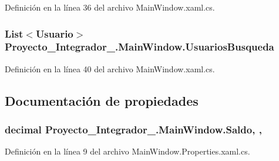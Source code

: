 Definición en la línea 36 del archivo Main\-Window.\-xaml.\-cs.

\hypertarget{class_proyecto___integrador__3_1_1_main_window_af1075eadedcbd62d11bd043542ea94de}{
\subsubsection[{Usuarios\-Busqueda}]{\setlength{\rightskip}{0pt plus 5cm}List$<${\bf Usuario}$>$ Proyecto\-\_\-\-Integrador\-\_.\-Main\-Window.\-Usuarios\-Busqueda\hspace{0.3cm}{\ttfamily [private]}}}\label{class_proyecto___integrador__3_1_1_main_window_af1075eadedcbd62d11bd043542ea94de}


Definición en la línea 40 del archivo Main\-Window.\-xaml.\-cs.



\subsection{Documentación de propiedades}
\hypertarget{class_proyecto___integrador__3_1_1_main_window_ad93b9e5447037b83ac9f811025390509}{
\subsubsection[{Saldo}]{\setlength{\rightskip}{0pt plus 5cm}decimal Proyecto\-\_\-\-Integrador\-\_.\-Main\-Window.\-Saldo\hspace{0.3cm}{\ttfamily [get]}, {\ttfamily [set]}, {\ttfamily [private]}}}\label{class_proyecto___integrador__3_1_1_main_window_ad93b9e5447037b83ac9f811025390509}


Definición en la línea 9 del archivo Main\-Window.\-Properties.\-xaml.\-cs.



